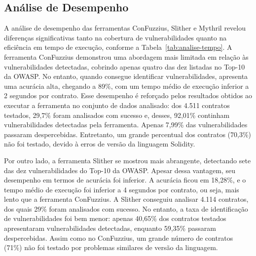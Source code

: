 \documentclass[12pt]{article}
\begin{document}

\subsection{Análise de Desempenho}\label{subsec:performanceanalysis}

A análise de desempenho das ferramentas ConFuzzius, Slither e Mythril revelou diferenças significativas tanto na cobertura de vulnerabilidades quanto na eficiência em tempo de execução, conforme a Tabela~\ref{tab:analise-tempo}. A ferramenta ConFuzzius demonstrou uma abordagem mais limitada em relação às vulnerabilidades detectadas, cobrindo apenas quatro das dez listadas no Top-10 da OWASP. No entanto, quando consegue identificar vulnerabilidades, apresenta uma acurácia alta, chegando a 89\%, com um tempo médio de execução inferior a 2 segundos por contrato. Esse desempenho é reforçado pelos resultados obtidos ao executar a ferramenta no conjunto de dados analisado: dos 4.511 contratos testados, 29,7\% foram analisados com sucesso e, desses, 92,01\% continham vulnerabilidades detectadas pela ferramenta. Apenas 7,99\% das vulnerabilidades passaram despercebidas. Entretanto, um grande percentual dos contratos (70,3\%) não foi testado, devido à erros de versão da linguagem Solidity.

Por outro lado, a ferramenta Slither se mostrou mais abrangente, detectando sete das dez vulnerabilidades do Top-10 da OWASP. Apesar dessa vantagem, seu desempenho em termos de acurácia foi inferior. A acurácia ficou em 18,28\%, e o tempo médio de execução foi inferior a 4 segundos por contrato, ou seja, mais lento que a ferramenta ConFuzzius. A Slither conseguiu analisar 4.114 contratos, dos quais 29\% foram analisados com sucesso. No entanto, a taxa de identificação de vulnerabilidades foi bem menor: apenas 40,65\% dos contratos testados apresentaram vulnerabilidades detectadas, enquanto 59,35\% passaram despercebidas. Assim como no ConFuzzius, um grande número de contratos (71\%) não foi testado por problemas similares de versão da linguagem.
\end{document}
